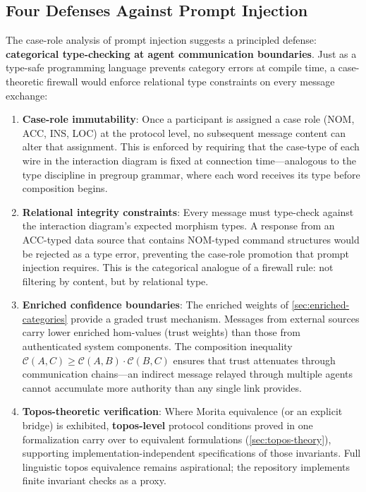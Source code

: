 \documentclass[
]{article}
\begin{document}
\subsection{Four Defenses Against Prompt
Injection}\label{four-defenses-against-prompt-injection}

The case-role analysis of prompt injection suggests a principled
defense: \textbf{categorical type-checking at agent communication
boundaries}. Just as a type-safe programming language prevents category
errors at compile time, a case-theoretic firewall would enforce
relational type constraints on every message exchange:

\begin{enumerate}
\def\labelenumi{\arabic{enumi}.}
\item
  \textbf{Case-role immutability}: Once a participant is assigned a case
  role (NOM, ACC, INS, LOC) at the protocol level, no subsequent message
  content can alter that assignment. This is enforced by requiring that
  the case-type of each wire in the interaction diagram is fixed at
  connection time---analogous to the type discipline in pregroup
  grammar, where each word receives its type before composition begins.
\item
  \textbf{Relational integrity constraints}: Every message must
  type-check against the interaction diagram's expected morphism types.
  A response from an ACC-typed data source that contains NOM-typed
  command structures would be rejected as a type error, preventing the
  case-role promotion that prompt injection requires. This is the
  categorical analogue of a firewall rule: not filtering by content, but
  by relational type.
\item
  \textbf{Enriched confidence boundaries}: The enriched weights of
  \autoref{sec:enriched-categories} provide a graded trust mechanism.
  Messages from external sources carry lower enriched hom-values (trust
  weights) than those from authenticated system components. The
  composition inequality
  \(\mathcal{C}(A,C) \geq \mathcal{C}(A,B) \cdot \mathcal{C}(B,C)\)
  ensures that trust attenuates through communication chains---an
  indirect message relayed through multiple agents cannot accumulate
  more authority than any single link provides.
\item
  \textbf{Topos-theoretic verification}: Where Morita equivalence (or an
  explicit bridge) is exhibited, \textbf{topos-level} protocol
  conditions proved in one formalization carry over to equivalent
  formulations (\autoref{sec:topos-theory}), supporting
  implementation-independent specifications of those invariants. Full
  linguistic topos equivalence remains aspirational; the repository
  implements finite invariant checks as a proxy.
\end{enumerate}
\end{document}
